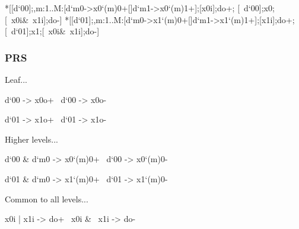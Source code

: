 \documentclass{article}
\begin{document}
\begin{hse}
*[[d`{00}];\langle,m:1..M:[d`{m0}->x0`{(m)0}+[]d`{m1}->x0`{(m)1}+]\rangle;[x0i];do+;
  [~d`{00}];x0\!\Downarrow;[~x0i&~x1i];do-]
*[[d`{01}];\langle,m:1..M:[d`{m0}->x1`{(m)0}+[]d`{m1}->x1`{(m)1}+]\rangle;[x1i];do+;
  [~d`{01}];x1\!\Downarrow;[~x0i&~x1i];do-]
\end{hse}

\subsubsection{PRS}

Leaf...

\begin{prs2}
d`{00} -> x0o+
~d`{00} -> x0o-

d`{01} -> x1o+
~d`{01} -> x1o-
\end{prs2}

\noindent Higher levels...

\begin{prs2}
d`{00} & d`{m0} -> x0`{(m)0}+
~d`{00} -> x0`{(m)0}-

d`{01} & d`{m0} -> x1`{(m)0}+
~d`{01} -> x1`{(m)0}-
\end{prs2}

\noindent Common to all levels...

\begin{prs2}
x0i | x1i -> do+
~x0i & ~x1i -> do-
\end{prs2}
\end{document}
